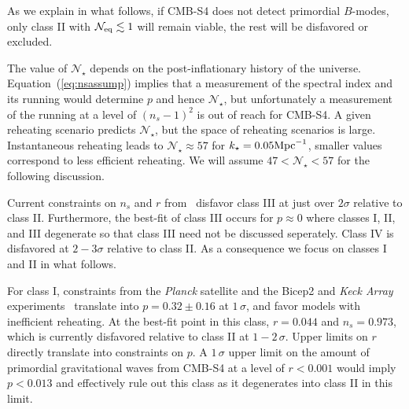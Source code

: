 As we explain in what follows, if CMB-S4 does not detect primordial $B$-modes, only class II with $\mathcal{N}_{\rm eq}\lesssim 1$ will remain viable, the rest will be disfavored or excluded.

The value of $\mathcal{N}_\star$ depends on the post-inflationary history of the universe. Equation~(\ref{eq:nsassump}) implies that a measurement of the spectral index and its running would determine $p$ and hence $\mathcal{N}_\star$, but unfortunately a measurement of the running at a level of $(n_s-1)^2$ is out of reach for CMB-S4. A given reheating scenario predicts $\mathcal{N}_\star$, but the space of reheating scenarios is large. Instantaneous reheating leads to $\mathcal{N}_\star\approx 57$ for $k_\star=0.05 {\rm Mpc}^{-1}$, smaller values correspond to less efficient reheating. We will assume $47<\mathcal{N}_\star<57$ for the following discussion. 

Current constraints on $n_s$ and $r$ from~\cite{bicepkeckplanck15} disfavor class III at just over $2\sigma$ relative to class II. Furthermore, the best-fit of class III occurs for $p\approx 0$ where classes I, II, and III degenerate so that class III need not be discussed seperately. Class IV is disfavored at $2-3\sigma$ relative to class II. As a consequence we focus on classes I and II in what follows.

For class I, constraints from the {\it Planck} satellite and the {\sc Bicep}2 and {\it Keck Array} experiments~\cite{bicepkeckplanck15} translate into $p=0.32\pm0.16$ at $1\,\sigma$, and favor models with inefficient reheating. At the best-fit point in this class, $r=0.044$ and $n_s=0.973$, which is currently disfavored relative to class II at $1-2\,\sigma$. Upper limits on $r$ directly translate into constraints on $p$. A $1\,\sigma$ upper limit on the amount of primordial gravitational waves from CMB-S4 at a level of $r<0.001$ would imply $p<0.013$ and effectively rule out this class as it degenerates into class II in this limit. 

